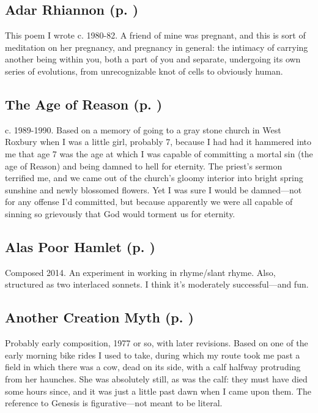 \subsection*{Adar Rhiannon (p. \pageref{ch:adar_rhiannon})}
This poem I wrote c. 1980-82. A friend of mine was pregnant, and this is sort of meditation on her
pregnancy, and pregnancy in general: the intimacy of carrying another
being within you, both a part of you and separate, undergoing its own
series of evolutions, from unrecognizable knot of cells to obviously
human.

\subsection*{The Age of Reason (p. \pageref{ch:age_of_reason})}
c. 1989-1990. Based on a memory of going to a gray stone church in West Roxbury when I
was a little girl, probably 7, because I had had it hammered into me
that age 7 was the age at which I was capable of committing a mortal sin
(the age of Reason) and being damned to hell for eternity. The priest's
sermon terrified me, and we came out of the church's gloomy interior
into bright spring sunshine and newly blossomed flowers. Yet I was sure
I would be damned---not for any offense I'd committed, but because
apparently we were all capable of sinning so grievously that God would
torment us for eternity.

\subsection*{Alas Poor Hamlet (p. \pageref{ch:alas_poor_hamlet})}
Composed 2014. An experiment in working in rhyme/slant rhyme. Also, structured as two
interlaced sonnets. I think it's moderately successful---and
fun.

\subsection*{Another Creation Myth (p. \pageref{ch:another_creation_myth})}
Probably early composition, 1977 or so, with later
revisions. Based on one of the early morning bike rides
I used to take, during which my route took me past a field in which
there was a cow, dead on its side, with a calf halfway protruding from
her haunches. She was absolutely still, as was the calf: they must have
died some hours since, and it was just a little past dawn when I came
upon them. The reference to Genesis is figurative---not meant to be
literal.

